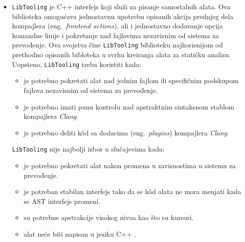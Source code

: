 \documentclass[12pt,oneside]{memoir}
\begin{document}
\begin{itemize}
\item \texttt{LibTooling} je C++ interfejs koji slu\v{z}i za pisanje samostalnih alata. Ova biblioteka omogu\'{c}ava jednostavnu
upotrebu opisanih akcija prednjeg dela kompajlera (eng.~\textit{frontend actions}), ali i jednostavno dodavanje opcija komandne linije i pokretanje nad fajlovima 
nezavisnim od sistema za prevođenje. Ova svojstva \v{c}ine \texttt{LibTooling} biblioteku najkorisnijom od prethodno opisanih bibloteka u svrhu kreiranja alata za stati\v{c}ku analizu.
Uopsteno, \texttt{LibTooling} treba koristiti kada:
\begin{itemize}
  \item je potrebno pokretati alat nad jednim fajlom ili specifi\v{c}nim podskupom fajlova nezavisnim od sistema za prevođenje.
  \item je potrebno imati punu kontrolu nad apstraktnim sintaksnom stablom kompajlera \textit{Clang}.
  \item je potrebno deliti k\^{o}d sa dodacima (eng.~\textit{plugins}) kompajlera \textit{Clang}.
\end{itemize}
\texttt{LibTooling} nije najbolji izbor u slu\v{c}ajevima kada:
\begin{itemize}
  \item je potrebno pokretati alat nakon promena u zavisnostima u sistemu za prevođenje.
  \item je potreban stabilan interfejs tako da se k\^{o}d alata ne mora menjati kada se AST interfejs promeni.
  \item su potrebne apstrakcije visokog nivoa kao \v{s}to su kursori.
  \item alat ne\'{c}e biti napisan u jeziku C++ \cite{RightInterface}.
\end{itemize}
\end{itemize}
\end{document}
